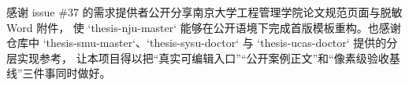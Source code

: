 感谢 issue \#37 的需求提供者公开分享南京大学工程管理学院论文规范页面与脱敏 Word 附件，
使 `thesis-nju-master` 能够在公开语境下完成首版模板重构。也感谢仓库中
`thesis-smu-master`、`thesis-sysu-doctor` 与 `thesis-ucas-doctor` 提供的分层实现参考，
让本项目得以把“真实可编辑入口”“公开案例正文”和“像素级验收基线”三件事同时做好。
